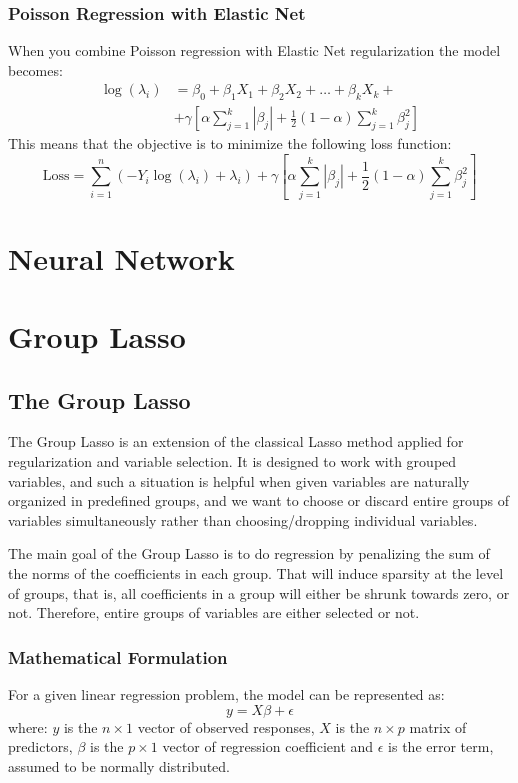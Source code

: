 \documentclass[a4paper, 8pt]{article}
\begin{document}
\begin{multicols}{2}
\subsubsection{Poisson Regression with Elastic Net}
When you combine Poisson regression with Elastic Net regularization the model becomes:
\begin{equation}
\begin{split}
\log(\lambda_i)&=\beta_0+\beta_1X_1+\beta_2X_2+\dots+\beta_kX_k+ \\
&+\gamma \left[\alpha \sum_{j=1}^k|\beta_j| + \frac{1}{2}(1-\alpha)\sum_{j=1}^k\beta_{j}^{2} \right]
\end{split}
\end{equation}
This means that the objective is to minimize the following loss function:
\begin{equation*}
\text{Loss}=\sum_{i=1}^n(-Y_i \log(\lambda_i)+ \lambda_i)+ \gamma \left[\alpha \sum_{j=1}^k|\beta_j| + \frac{1}{2}(1-\alpha)\sum_{j=1}^k\beta_{j}^{2} \right]
\end{equation*}
\section{Neural Network}

\section{Group Lasso}
\subsection{The Group Lasso}
The Group Lasso is an extension of the classical Lasso method applied for regularization and variable selection. It is designed to work with grouped variables, and such a situation is helpful when given variables are naturally organized in predefined groups, and we want to choose or discard entire groups of variables simultaneously rather than choosing/dropping individual variables.

The main goal of the Group Lasso is to do regression by penalizing the sum of the norms of the coefficients in each group. That will induce sparsity at the level of groups, that is, all coefficients in a group will either be shrunk towards zero, or not. Therefore, entire groups of variables are either selected or not.

\subsubsection*{Mathematical Formulation}
For a given linear regression problem, the model can be represented as:
\begin{equation}
y=X\beta + \epsilon
\end{equation}
where: $y$ is the $n \times 1$ vector of observed responses, $X$ is the $n \times p$ matrix of predictors, $\beta$ is the $p \times 1$ vector of regression coefficient and $\epsilon$ is the error term, assumed to be normally distributed.\\


\end{multicols}
\end{document}
